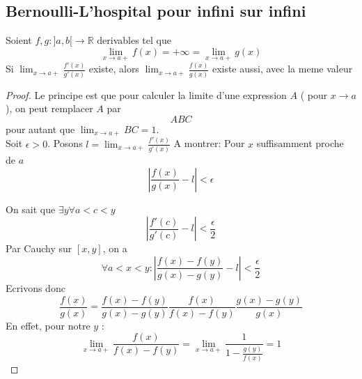 \documentclass[../main.tex]{subfiles}
\begin{document}
\subsection{Bernoulli-L'hospital pour infini sur infini}
\begin{thm}
	Soient $f,g: ]a,b[ \to \mathbb{R}$ derivables tel que
	\[ 
		\lim_{x \to a+} f( x) = + \infty = \lim_{x \to a+} g( x) 
	\]
	Si $ \lim_{x \to a+} \frac{f'( x) }{g'( x) }$ existe, alors $ \lim_{x \to a+} \frac{f( x) }{g( x) }$ existe aussi, avec la meme valeur
\end{thm}
\begin{proof}
	Le principe est que pour calculer la limite d'une expression $A$ ( pour $x \to a$), on peut remplacer $A$ par
	\[ 
	ABC
	\]
	pour autant que $\lim_{x \to a+} BC= 1$. \\
	Soit $\epsilon > 0$. Posons $l= \lim_{x \to a+} \frac{f'( x) }{g'( x) } $ 
	A montrer: Pour $x$ suffisamment proche de $a$
	\[ 
		| \frac{f( x) }{g( x) }-l | < \epsilon
	\]

	On sait que $\exists y \forall a <c <y$ 
	\[ 
		|\frac{f'( c) }{g'( c) }-l| < \frac{\epsilon}{2}
	\]
	Par Cauchy sur $[x,y]$, on a 
	\[ 
		\forall a<x<y: | \frac{f( x) -f( y) }{g( x) -g( y) }-l| < \frac{\epsilon}{2}
	\]
	Ecrivons donc
	\[ 
		\frac{f( x) }{g( x) }= \frac{f( x) - f( y) }{g( x) -g( y) } \frac{f( x) }{f( x) - f( y) } \frac{g( x) -g( y) }{g( x) }
	\]
En effet, pour notre $y$ :
\[ 
	\lim_{x \to a+} \frac{f( x) }{f( x) -f( y) }= \lim_{x \to a+} \frac{1}{1-\frac{ g( y )}{f( x) }}=1
\]


	
	
	
\end{proof}
\end{document}
